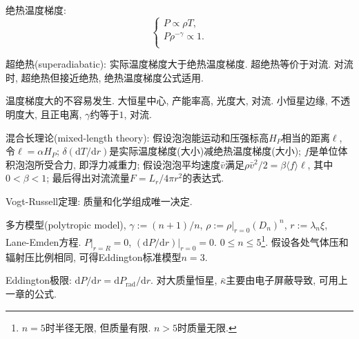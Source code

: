 绝热温度梯度:
\begin{equation*}
    \begin{cases}
        P\propto \rho T, \\
        P\rho^{-\gamma} \propto 1. \\
    \end{cases}
\end{equation*}

超绝热(superadiabatic): 实际温度梯度大于绝热温度梯度. 超绝热等价于对流. 对流时, 超绝热但接近绝热, 绝热温度梯度公式适用.

温度梯度大的不容易发生. 大恒星中心, 产能率高, 光度大, 对流. 小恒星边缘, 不透明度大, 且正电离, $\gamma$约等于$1$, 对流.

混合长理论(mixed-length theory): 假设泡泡能运动和压强标高$H_P$相当的距离$\ell$, 令$\ell=\alpha H_P$; $\delta(\mathrm{d}T/\mathrm{d}r)$是实际温度梯度(大小)减绝热温度梯度(大小); $f$是单位体积泡泡所受合力, 即浮力减重力; 假设泡泡平均速度$\bar{v}$满足$\rho\bar{v}^2/2=\beta\langle f\rangle\ell$, 其中$0<\beta<1$; 最后得出对流流量$F=L_r/4\pi r^2$的表达式.

Vogt-Russell定理: 质量和化学组成唯一决定.

多方模型(polytropic model), $\gamma:=(n+1)/n$, $\rho:=\rho|_{r=0}(D_n)^n$, $r:=\lambda_n\xi$, Lane-Emden方程. $P|_{r=R}=0$, $(\mathrm{d}P/\mathrm{d}r)|_{r=0}=0$. $0\le n \le 5$\footnote{
    $n=5$时半径无限, 但质量有限. $n>5$时质量无限.
}. 假设各处气体压和辐射压比例相同, 可得Eddington标准模型$n=3$.

Eddington极限: $\mathrm{d}P/\mathrm{d}r=\mathrm{d}P_\text{rad}/\mathrm{d}r$. 对大质量恒星, $\bar{\kappa}$主要由电子屏蔽导致, 可用上一章的公式.
